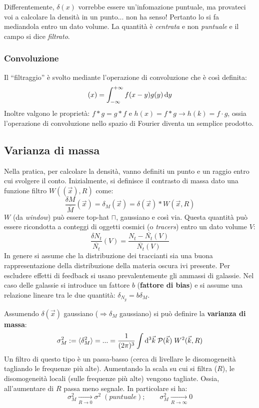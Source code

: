 Differentemente, $\delta (x)$ vorrebbe essere un'infomazione puntuale, ma provateci voi a calcolare la densità in un punto... non ha senso! Pertanto lo si fa mediandola entro un dato volume. La quantità è \textit{centrata} e non \textit{puntuale} e il campo si dice \textit{filtrato}.

\subsubsection*{Convoluzione}
Il ``filtraggio'' è svolto mediante l'operazione di convoluzione che è così definita:
\begin{equation*}
    [f*g](x) = \int_{-\infty}^{+\infty}f(x-y)g(y)\d{y}
\end{equation*}
Inoltre valgono le proprietà: $f*g=g*f$ e $h(x)=f*g\rightarrow h(k)=f\cdot g$, ossia l'operazione di convoluzione nello spazio di Fourier diventa un semplice prodotto. 

\subsection{Varianza di massa}
Nella pratica, per calcolare la densità, vanno definiti un punto e un raggio entro cui svolgere il conto. Inizialmente, si definisce il contrasto di massa dato una funzione filtro $W((\vec{x}),R)$ come:
$$
\frac{\delta M}{\overline{M}}(\vec{x}) = \delta_M(\vec{x}) = \delta (\vec{x}) * W(\vec{x}, R)
$$
$W$ (da \textit{window}) può essere top-hat $\sqcap $, gaussiano e così via. Questa quantità può essere ricondotta a conteggi di oggetti cosmici (o \textit{tracers}) entro un dato volume $V$:
$$
\frac{\delta N_t}{\overline{N_t}}(V) = \frac{N_t-\overline{N_t}(V)}{\overline{N_t}(V)}
$$
In genere si assume che la distribuzione dei traccianti sia una buona rappresentazione della distribuzione della materia oscura ivi presente. Per escludere effetti di feedback si usano prevalentemente gli ammassi di galassie. Nel caso delle galassie si introduce un fattore $b$ (\textbf{fattore di bias}) e si assume una relazione lineare tra le due quantità: $\delta_{N_g} = b \delta_M$.

Assumendo $\delta (\vec{x})$ gaussiano ($\Rightarrow \delta_M$ gaussiano) si può definire la \textbf{varianza di massa}:
\begin{equation}
    \sigma_M^2 :=  \langle  \delta_M ^2 \rangle = ... = \frac{1}{(2\pi)^3}\int \operatorname{d}\!{^3\vec{k}}\; \mathcal{P}(\vec{k}) \; W^2(\vec{k}, R)
\end{equation}
Un filtro di questo tipo è un passa-basso (cerca di livellare le disomogeneità tagliando le frequenze più alte). Aumentando la scala su cui si filtra ($R$), le disomogeneità locali (sulle frequenze più alte) vengono tagliate. Ossia, all'aumentare di $R$ passa meno segnale. In particolare si ha:
\begin{equation}
    \sigma_M^2 \xrightarrow[R\to 0]{} \sigma^2 \; (puntuale); \qquad \sigma_M^2 \xrightarrow[R\to \infty]{} 0 \label{eq8:sigmamvsr}
\end{equation}

